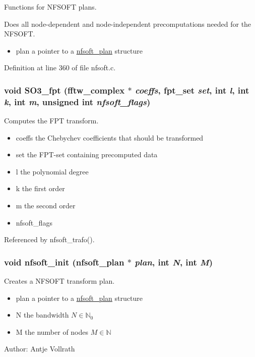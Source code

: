 Functions for NFSOFT plans. 

Does all node-dependent and node-independent precomputations needed for the NFSOFT.

\begin{itemize}
\item plan a pointer to a \hyperlink{structnfsoft__plan}{nfsoft\_\-plan} structure \end{itemize}


Definition at line 360 of file nfsoft.c.\hypertarget{group__nfsoft_gfdc0cc0432918bfa8643c7a5f42d7ea5}{
\subsubsection{\setlength{\rightskip}{0pt plus 5cm}void SO3\_\-fpt (fftw\_\-complex $\ast$ {\em coeffs}, {\bf fpt\_\-set} {\em set}, int {\em l}, int {\em k}, int {\em m}, unsigned int {\em nfsoft\_\-flags})}}
\label{group__nfsoft_gfdc0cc0432918bfa8643c7a5f42d7ea5}


Computes the FPT transform. 

\begin{itemize}
\item coeffs the Chebychev coefficients that should be transformed \item set the FPT-set containing precomputed data \item l the polynomial degree \item k the first order \item m the second order \item nfsoft\_\-flags \end{itemize}


Referenced by nfsoft\_\-trafo().\hypertarget{group__nfsoft_g31c884458165fa204073c6c16c10775e}{
\subsubsection{\setlength{\rightskip}{0pt plus 5cm}void nfsoft\_\-init ({\bf nfsoft\_\-plan} $\ast$ {\em plan}, int {\em N}, int {\em M})}}
\label{group__nfsoft_g31c884458165fa204073c6c16c10775e}


Creates a NFSOFT transform plan. 

\begin{itemize}
\item plan a pointer to a \hyperlink{structnfsoft__plan}{nfsoft\_\-plan} structure \item N the bandwidth $N \in \mathbb{N}_0$ \item M the number of nodes $M \in \mathbb{N}$\end{itemize}
\begin{Desc}
\item[Author:]Antje Vollrath \end{Desc}


